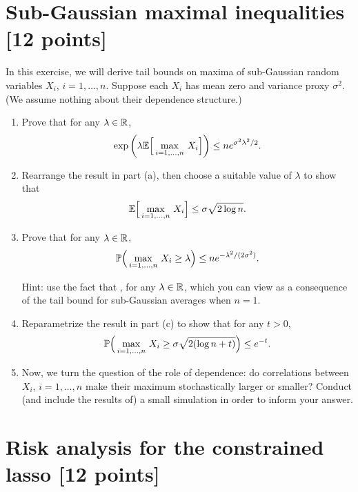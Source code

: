 \documentclass{article}
\begin{document}
\section{Sub-Gaussian maximal inequalities [12 points]}

In this exercise, we will derive tail bounds on maxima of sub-Gaussian random
variables $X_i$, $i=1,\dots,n$. Suppose each $X_i$ has mean zero and variance
proxy $\sigma^2$. (We assume nothing about their dependence structure.)

\begin{enumerate}[label=(\alph*)]
\item Prove that for any $\lambda \in \R$,
  \marginpar{\small [3 pts]}
  \[
  \exp \bigg( \lambda \E\Big[ \max_{i=1,\dots,n} \, X_i \Big] \bigg) \leq n
  e^{\sigma^2 \lambda^2/2}.   
  \]

\item Rearrange the result in part (a), then choose a suitable value of
  $\lambda$ to show that     
  \marginpar{\small [2 pts]}
  \[
  \E \Big[ \max_{i=1,\dots,n} \, X_i \Big] \leq \sigma \sqrt{2 \log n}. 
  \]

\item Prove that for any $\lambda \in \R$,
  \marginpar{\small [2 pts]}
  \[
  \P \Big(\max_{i=1,\dots,n} \, X_i \geq \lambda \Big) \leq ne^{-\lambda^2 /
    (2\sigma^2)}.  
  \]

  Hint: use the fact that , for any $\lambda \in \R$, which you can view as a
  consequence of the tail bound for sub-Gaussian averages when $n=1$. 

\item Reparametrize the result in part (c) to show that for any $t>0$,
  \marginpar{\small [1 pt]}
  \[
  \P \Big(\max_{i=1,\dots,n} \, X_i \geq \sigma \sqrt{2 (\log n + t)} \Big) 
  \leq e^{-t}.   
  \]

\item Now, we turn the question of the role of dependence: do correlations 
  between $X_i$, $i=1,\dots,n$ make their maximum stochastically larger or
  smaller? Conduct (and include the results of) a small simulation in order to
  inform your answer. 
  \marginpar{\small [4 pts]}
 \end{enumerate}

\section{Risk analysis for the constrained lasso [12 points]}
\end{document}
